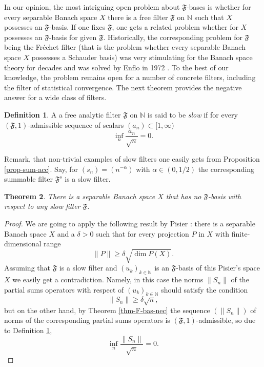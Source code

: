 \documentclass[11pt,twoside, reqno]{amsart}
\newcommand{\N}{{\mathbb N}}
\newcommand{\F}{\mathfrak{F}}
\theoremstyle{plain}
\newtheorem{theorem}{Theorem}[section]
\theoremstyle{remark}
\theoremstyle{definition}
\newtheorem{definition}[theorem]{Definition}
\numberwithin{equation}{section}
\begin{document}
In our opinion, the most intriguing open problem about $\F$-bases is whether for every separable Banach space $X$ there is a free filter  $\F$ on $\N$ such that $X$ possesses an $\F$-basis. If one fixes $\F$, one gets a related problem whether for $X$ possesses an $\F$-basis for given $\F$. Historically, the corresponding problem for $\F$ being the Fr\'echet filter (that is the problem whether every separable Banach space $X$ possesses a Schauder basis) was very stimulating for the Banach space theory for decades and was solved by Enflo in 1972 \cite{enflo}. To the best of our knowledge, the problem remains open for a number of concrete filters, including the filter of statistical convergence. The next theorem provides the negative answer for a wide class of filters.

\begin{definition} \label{defslowfil}
A a free analytic filter $\mathfrak F$ on $\mathbb N$ is said to be \emph{slow} if for every $(\F, 1)$-admissible sequence of scalars $(a_n) \subset [1, \infty)$ 
$$
\inf_n \frac{a_n}{\sqrt{n}} = 0.
$$
\end{definition}

Remark, that non-trivial examples of slow filters one easily gets from Proposition \ref{prop-sum-acc}. Say, for $(s_n) = (n^{-\alpha})$ with $\alpha \in (0, 1/2)$ the corresponding summable filter $\F^{s}$ is a slow filter.

\begin{theorem}  \label{thm-slowfil}
There is a separable Banach space $X$ that has no $\F$-basis with respect to any    slow filter $\F$. 
\end{theorem}
\begin{proof}
We are going to apply the following result by Pisier \cite[Corollary 10.8]{Pisier1986}: there is  a  separable Banach space $X$ and a $\delta > 0$ such that for every projection $P$ in $X$ with finite-dimensional range
$$
\|P\| \ge \delta \sqrt{\dim P(X)}.
$$
Assuming that $\F$ is a slow filter and  $(u_k)_{k \in \N}$ is an $\F$-basis of this Pisier's space $X$ we easily get a contradiction. Namely, in this case  the norms $\|S_n\|$ of the partial sums operators with respect of $(u_k)_{k \in \N}$ should satisfy the condition 
$$
\|S_n\| \ge \delta \sqrt{n},
$$
but on the other hand, by Theorem \ref{thm-F-bas-nec} the sequence $\left(\|S_n\|\right)$ of norms of the corresponding partial sums operators is $(\F, 1)$-admissible, so due to Definition \ref{defslowfil},
$$
\inf_n \frac{\|S_n\|}{\sqrt{n}} = 0.
$$
\end{proof}
\end{document}
